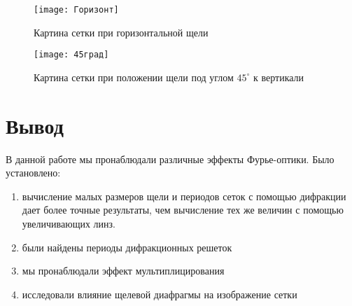 	\begin{figure}[h!]
        \begin{center}
            \begin{minipage}[h!]{0.48\linewidth}
				\centering
                \texttt{[image: Горизонт]}
				\caption{Картина сетки при горизонтальной щели}
            \end{minipage}
            \hfill
            \begin{minipage}[h!]{0.48\linewidth}
				\centering
                \texttt{[image: 45град]}
 				\caption{Картина сетки при положении щели под углом $45^\circ$ к вертикали}
            \end{minipage}
        \end{center}
    \end{figure}

	\section{Вывод}

    В данной работе мы пронаблюдали различные эффекты Фурье-оптики. Было установлено:
    
    \begin{enumerate}
    	\item вычисление малых размеров щели и периодов сеток с помощью дифракции дает более точные результаты, чем вычисление тех же величин с помощью увеличивающих линз.
    	\item были найдены периоды дифракционных решеток
    	\item мы пронаблюдали эффект мультиплицирования
    	\item исследовали влияние щелевой диафрагмы на изображение сетки
    \end{enumerate}
    
